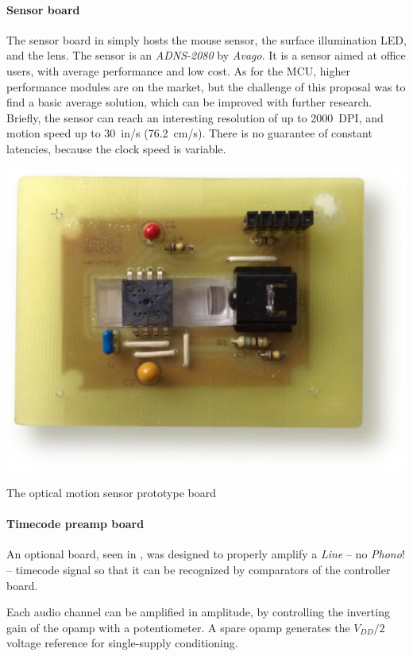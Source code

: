 \documentclass[a4paper,10pt]{article}
\makeatletter
\newenvironment{figurehere}{\def\@captype{figure}\vspace{2ex}}{\vspace{2ex}}
\makeatother
\begin{document}
\begin{multicols}{2}
\paragraph{Sensor board}
The sensor board in  simply hosts the mouse sensor,
the surface illumination LED, and the lens. The sensor is an \emph{ADNS-2080}
\cite{avago_adns2080} by \emph{Avago}. It is a sensor aimed at office users,
with average performance and low cost. As for the MCU, higher performance
modules are on the market, but the challenge of this proposal was to find a
basic average solution, which can be improved with further research. Briefly,
the sensor can reach an interesting resolution of up to 2000~DPI, and motion
speed up to 30~in/s (76.2~cm/s). There is no guarantee of constant latencies,
because the clock speed is variable.

\begin{figurehere}
	\centering
	\includegraphics[keepaspectratio=true,width=\columnwidth]{images/sensor_photo.pdf}
	\caption{The optical motion sensor prototype board}
	\label{fig:sensor_photo}
\end{figurehere}


\paragraph{Timecode preamp board}
An optional board, seen in , was designed to properly
amplify a \emph{Line} -- no \emph{Phono}! -- timecode signal so that it can be
recognized by comparators of the controller board.

Each audio channel can be amplified in amplitude, by controlling the inverting
gain of the opamp with a potentiometer. A spare opamp generates the $V_{DD}/2$
voltage reference for single-supply conditioning.


\end{multicols}
\end{document}
